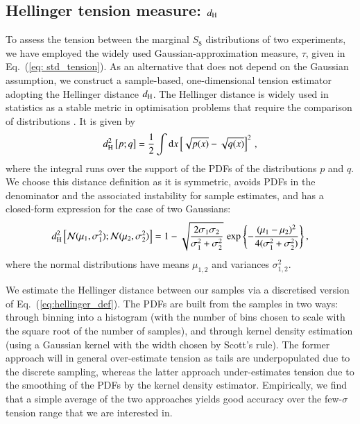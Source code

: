 \begin{appendix}
\subsection{Hellinger tension measure: $d_{\rm H}$}
\label{app:hellinger}
To assess the tension between the marginal $S_8$ distributions of two experiments, we have employed the widely used Gaussian-approximation measure, $\tau$, given in Eq.~(\ref{eq: std_tension}).  As an alternative that does not depend on the Gaussian assumption, we construct a sample-based, one-dimensional tension estimator adopting the Hellinger distance $d_{\rm H}$. The Hellinger distance is widely used in statistics as a stable metric in optimisation problems that require the comparison of distributions \citep[e.g.][]{beran77}. It is given by
\begin{equation}
\label{eq:hellinger_def}
d_{\rm H}^2 \left[  p; q \right] = \frac{1}{2} \int {\rm d}x \left[  \sqrt{p(x)} - \sqrt{q(x)}  \right]^2\,,
\end{equation}
where the integral runs over the support of the PDFs of the distributions $p$ and $q$. We choose this distance definition as it is symmetric, avoids PDFs in the denominator and the associated instability for sample estimates, and has a closed-form expression for the case of two Gaussians:
\begin{equation}
\label{eq:hellinger_gauss}
d_{\rm H}^2 \left[  {\cal N}(\mu_1,\sigma_1^2); {\cal N}(\mu_2,\sigma_2^2)  \right] = 1 - \sqrt{ \frac{2 \sigma_1 \sigma_2}{\sigma_1^2 + \sigma_2^2} }\,  \exp \left\{  - \frac{(\mu_1 - \mu_2)^2}{4 (\sigma_1^2 + \sigma_2^2)}  \right\} , 
\end{equation}
where the normal distributions have means $\mu_{1,2}$ and variances $\sigma_{1,2}^2$. 

We estimate the Hellinger distance between our samples via a discretised version of Eq.~(\ref{eq:hellinger_def}). The PDFs are built from the samples in two ways: through binning into a histogram (with the number of bins chosen to scale with the square root of the number of samples), and through kernel density estimation (using a Gaussian kernel with the width chosen by Scott's rule). The former approach will in general over-estimate tension as tails are underpopulated due to the discrete sampling, whereas the latter approach under-estimates tension due to the smoothing of the PDFs by the kernel density estimator. Empirically, we find that a simple average of the two approaches yields good accuracy over the few-$\sigma$ tension range that we are interested in.


\end{appendix}
